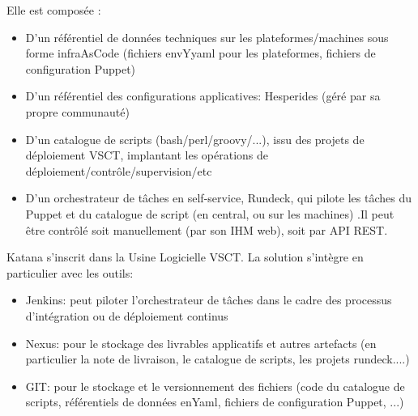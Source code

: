 Elle est composée :
\begin{itemize}
  \item D'un référentiel de données techniques sur les plateformes/machines sous forme infraAsCode (fichiers envYyaml pour les plateformes, fichiers de configuration Puppet)
  \item D'un référentiel des configurations applicatives: Hesperides (géré par sa propre communauté)
  \item D'un catalogue de scripts (bash/perl/groovy/...), issu des projets de déploiement VSCT, implantant les opérations de déploiement/contrôle/supervision/etc
  \item D'un orchestrateur de tâches en self-service, Rundeck, qui pilote les tâches du Puppet et du catalogue de script (en central, ou sur les machines) .Il peut être contrôlé soit manuellement (par son IHM web), soit par API REST.
\end{itemize}

Katana s'inscrit dans la Usine Logicielle VSCT. La solution s'intègre en particulier avec les outils:
\begin{itemize}
  \item Jenkins: peut piloter l'orchestrateur de tâches dans le cadre des processus d'intégration ou de déploiement continus
  \item Nexus: pour le stockage des livrables applicatifs et autres artefacts (en particulier la note de livraison, le catalogue de scripts, les projets rundeck....)
  \item GIT: pour le stockage et le versionnement des fichiers (code du catalogue de scripts, référentiels de données enYaml, fichiers de configuration Puppet, ...)
\end{itemize}
